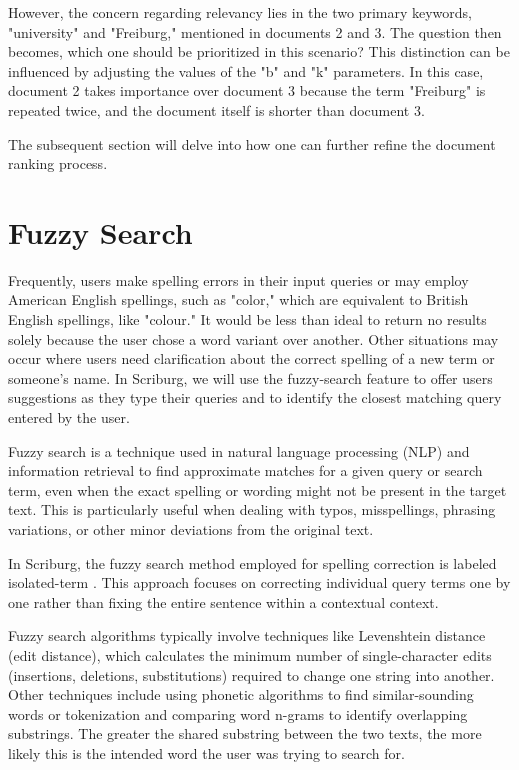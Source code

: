 However, the concern regarding relevancy lies in the two primary keywords, "university" and "Freiburg," mentioned in documents 2 and 3. The question then becomes, which one should be prioritized in this scenario? This distinction can be influenced by adjusting the values of the "b" and "k" parameters. In this case, document 2 takes importance over document 3 because the term "Freiburg" is repeated twice, and the document itself is shorter than document 3.

The subsequent section will delve into how one can further refine the document ranking process.


\section{Fuzzy Search}
Frequently, users make spelling errors in their input queries or may employ American English spellings, such as "color," which are equivalent to British English spellings, like "colour." It would be less than ideal to return no results solely because the user chose a word variant over another. Other situations may occur where users need clarification about the correct spelling of a new term or someone's name. In Scriburg, we will use the fuzzy-search feature to offer users suggestions as they type their queries and to identify the closest matching query entered by the user.

Fuzzy search is a technique used in natural language processing (NLP) and information retrieval to find approximate matches for a given query or search term, even when the exact spelling or wording might not be present in the target text. This is particularly useful when dealing with typos, misspellings, phrasing variations, or other minor deviations from the original text.

In Scriburg, the fuzzy search method employed for spelling correction is labeled isolated-term \cite{manning2008}. This approach focuses on correcting individual query terms one by one rather than fixing the entire sentence within a contextual context.

Fuzzy search algorithms typically involve techniques like Levenshtein distance (edit distance), which calculates the minimum number of single-character edits (insertions, deletions, substitutions) required to change one string into another. Other techniques include using phonetic algorithms to find similar-sounding words or tokenization and comparing word n-grams to identify overlapping substrings. The greater the shared substring between the two texts, the more likely this is the intended word the user was trying to search for.


